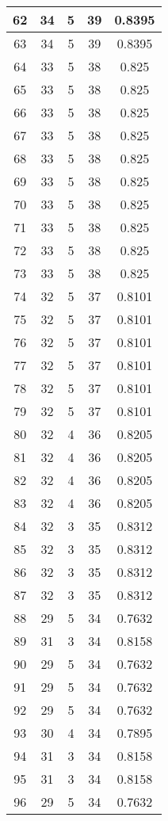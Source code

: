 \documentclass[letterpaper, 12pt]{article}
\begin{document}
\begin{longtable}{|c|c|c|c|c|}
\hline
62 & 34 & 5 & 39 & 0.8395 \\
\hline
63 & 34 & 5 & 39 & 0.8395 \\
\hline
64 & 33 & 5 & 38 & 0.825 \\
\hline
65 & 33 & 5 & 38 & 0.825 \\
\hline
66 & 33 & 5 & 38 & 0.825 \\
\hline
67 & 33 & 5 & 38 & 0.825 \\
\hline
68 & 33 & 5 & 38 & 0.825 \\
\hline
69 & 33 & 5 & 38 & 0.825 \\
\hline
70 & 33 & 5 & 38 & 0.825 \\
\hline
71 & 33 & 5 & 38 & 0.825 \\
\hline
72 & 33 & 5 & 38 & 0.825 \\
\hline
73 & 33 & 5 & 38 & 0.825 \\
\hline
74 & 32 & 5 & 37 & 0.8101 \\
\hline
75 & 32 & 5 & 37 & 0.8101 \\
\hline
76 & 32 & 5 & 37 & 0.8101 \\
\hline
77 & 32 & 5 & 37 & 0.8101 \\
\hline
78 & 32 & 5 & 37 & 0.8101 \\
\hline
79 & 32 & 5 & 37 & 0.8101 \\
\hline
80 & 32 & 4 & 36 & 0.8205 \\
\hline
81 & 32 & 4 & 36 & 0.8205 \\
\hline
82 & 32 & 4 & 36 & 0.8205 \\
\hline
83 & 32 & 4 & 36 & 0.8205 \\
\hline
84 & 32 & 3 & 35 & 0.8312 \\
\hline
85 & 32 & 3 & 35 & 0.8312 \\
\hline
86 & 32 & 3 & 35 & 0.8312 \\
\hline
87 & 32 & 3 & 35 & 0.8312 \\
\hline
88 & 29 & 5 & 34 & 0.7632 \\
\hline
89 & 31 & 3 & 34 & 0.8158 \\
\hline
90 & 29 & 5 & 34 & 0.7632 \\
\hline
91 & 29 & 5 & 34 & 0.7632 \\
\hline
92 & 29 & 5 & 34 & 0.7632 \\
\hline
93 & 30 & 4 & 34 & 0.7895 \\
\hline
94 & 31 & 3 & 34 & 0.8158 \\
\hline
95 & 31 & 3 & 34 & 0.8158 \\
\hline
96 & 29 & 5 & 34 & 0.7632 \\

\end{longtable}
\end{document}
